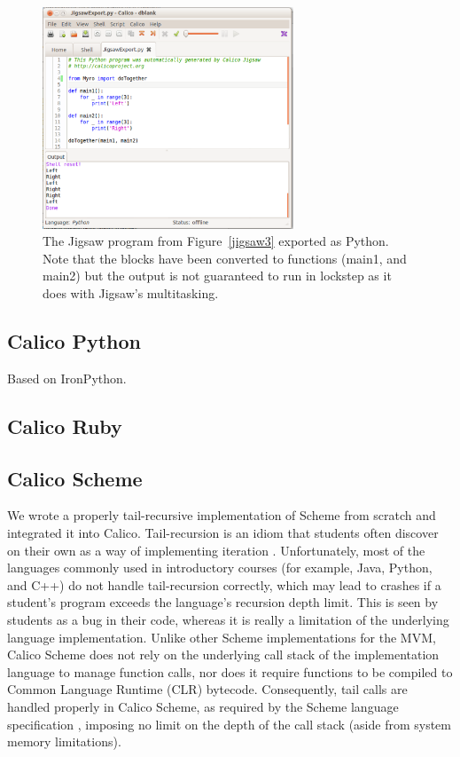 \documentclass[preprint]{sigplanconf}
\begin{document}
\begin{figure}[h!]
  \centering
    \includegraphics[width=75mm]{jigsaw4.eps} 
  \caption{The Jigsaw program from Figure~\ref{jigsaw3} exported
    as Python. Note that the blocks have been converted to functions
    (main1, and main2) but the output is not guaranteed to run in
    lockstep as it does with Jigsaw's multitasking.}
  \label{jigsaw4}
\end{figure}

\subsection{Calico Python}

Based on IronPython. 

\subsection{Calico Ruby}

\subsection{Calico Scheme}

We wrote a properly tail-recursive implementation of Scheme from
scratch and integrated it into Calico.  Tail-recursion is an idiom
that students often discover on their own as a way of implementing
iteration \cite{blank-kumar-2010}. Unfortunately, most of the
languages commonly used in introductory courses (for example, Java,
Python, and C++) do not handle tail-recursion correctly, which may
lead to crashes if a student's program exceeds the language's
recursion depth limit. This is seen by students as a bug in their
code, whereas it is really a limitation of the underlying language
implementation. Unlike other Scheme implementations for the MVM,
Calico Scheme does not rely on the underlying call stack of the
implementation language to manage function calls, nor does it require
functions to be compiled to Common Language Runtime (CLR)
bytecode. Consequently, tail calls are handled properly in Calico
Scheme, as required by the Scheme language specification
\cite{sperber-etal-2010}, imposing no limit on the depth of the call
stack (aside from system memory limitations).
\end{document}
